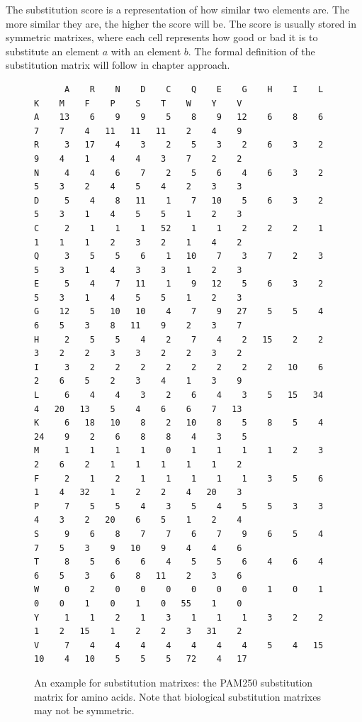 The substitution score is a representation of how similar two elements are. The more similar they are, the higher the score will be.
The score is usually stored in symmetric matrixes, where each cell represents how good or bad it is to substitute an element $a$ with an element $b$.
The formal definition of the substitution matrix will follow in chapter approach.
\begin{figure}
\centering
\scriptsize
\begin{verbatim}
      A    R    N    D    C    Q    E    G    H    I    L    K    M    F    P    S    T    W    Y    V
A    13    6    9    9    5    8    9   12    6    8    6    7    7    4   11   11   11    2    4    9
R     3   17    4    3    2    5    3    2    6    3    2    9    4    1    4    4    3    7    2    2
N     4    4    6    7    2    5    6    4    6    3    2    5    3    2    4    5    4    2    3    3
D     5    4    8   11    1    7   10    5    6    3    2    5    3    1    4    5    5    1    2    3
C     2    1    1    1   52    1    1    2    2    2    1    1    1    1    2    3    2    1    4    2
Q     3    5    5    6    1   10    7    3    7    2    3    5    3    1    4    3    3    1    2    3
E     5    4    7   11    1    9   12    5    6    3    2    5    3    1    4    5    5    1    2    3
G    12    5   10   10    4    7    9   27    5    5    4    6    5    3    8   11    9    2    3    7
H     2    5    5    4    2    7    4    2   15    2    2    3    2    2    3    3    2    2    3    2
I     3    2    2    2    2    2    2    2    2   10    6    2    6    5    2    3    4    1    3    9
L     6    4    4    3    2    6    4    3    5   15   34    4   20   13    5    4    6    6    7   13
K     6   18   10    8    2   10    8    5    8    5    4   24    9    2    6    8    8    4    3    5
M     1    1    1    1    0    1    1    1    1    2    3    2    6    2    1    1    1    1    1    2
F     2    1    2    1    1    1    1    1    3    5    6    1    4   32    1    2    2    4   20    3
P     7    5    5    4    3    5    4    5    5    3    3    4    3    2   20    6    5    1    2    4
S     9    6    8    7    7    6    7    9    6    5    4    7    5    3    9   10    9    4    4    6
T     8    5    6    6    4    5    5    6    4    6    4    6    5    3    6    8   11    2    3    6
W     0    2    0    0    0    0    0    0    1    0    1    0    0    1    0    1    0   55    1    0
Y     1    1    2    1    3    1    1    1    3    2    2    1    2   15    1    2    2    3   31    2
V     7    4    4    4    4    4    4    4    5    4   15   10    4   10    5    5    5   72    4   17
	\end{verbatim}
\normalsize
	\caption{An example for substitution matrixes: the PAM250 substitution matrix for amino acids\cite{dayhoff1978}. Note that biological substitution matrixes may not be symmetric.}
	\label{fig:submatexample}
\end{figure}
